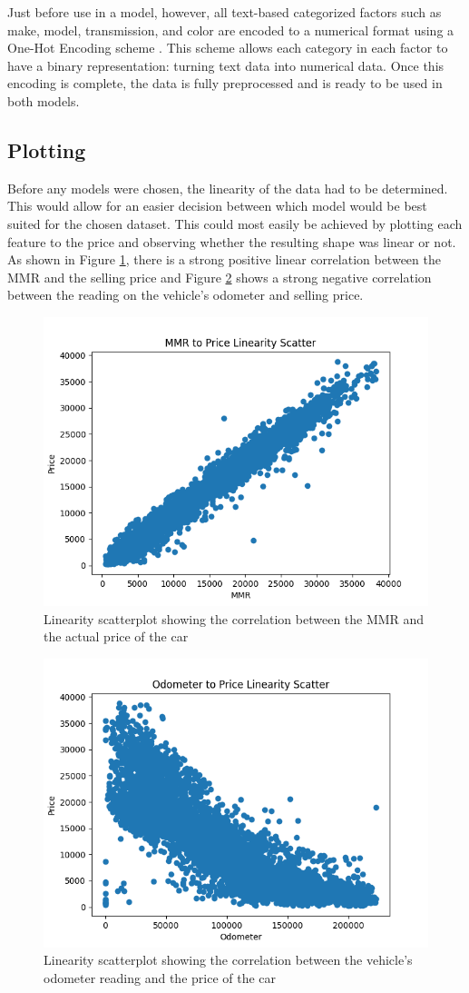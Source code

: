 \documentclass[compsoc]{IEEEtran}
\begin{document}
Just before use in a model, however, all text-based categorized factors such as make, model, transmission, and color are encoded to a numerical format using a One-Hot Encoding scheme \cite{model:one_hot_encoding}. This scheme allows each category in each factor to have a binary representation: turning text data into numerical data. Once this encoding is complete, the data is fully preprocessed and is ready to be used in both models.
\subsection{Plotting}
Before any models were chosen, the linearity of the data had to be determined. This would allow for an easier decision between which model would be best suited for the chosen dataset. This could most easily be achieved by plotting each feature to the price and observing whether the resulting shape was linear or not. As shown in Figure \ref{fig:mmr_linear}, there is a strong positive linear correlation between the MMR and the selling price and Figure \ref{fig:odometer_linear} shows a strong negative correlation between the reading on the vehicle's odometer and selling price. 

\begin{figure}[h]
    \centering
    \includegraphics[width=.48\textwidth]{images/mmr_to_price.png}
    \caption{Linearity scatterplot showing the correlation between the MMR and the actual price of the car}
    \label{fig:mmr_linear}
\end{figure}
\begin{figure}[h]
    \centering
    \includegraphics[width=.48\textwidth]{images/odometer_to_price.png}
    \caption{Linearity scatterplot showing the correlation between the vehicle's odometer reading and the price of the car}
    \label{fig:odometer_linear}
\end{figure}
\end{document}
